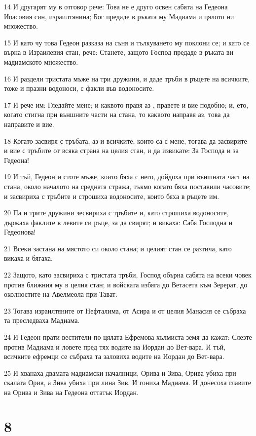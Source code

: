 \par 14 И другарят му в отговор рече: Това не е друго освен сабята на Гедеона Иоасовия син, израилтянина; Бог предаде в ръката му Мадиама и цялото ни множество.
\par 15 И като чу това Гедеон разказа на съня и тълкуването му поклони се; и като се върна в Израилевия стан, рече: Станете, защото Господ предаде в ръката ви мадиамското множество.
\par 16 И раздели тристата мъже на три дружини, и даде тръби в ръцете на всичките, тоже и празни водоноси, с факли във водоносите.
\par 17 И рече им: Гледайте мене; и каквото правя аз , правете и вие подобно; и, ето, когато стигна при външните части на стана, то каквото направя аз, това да направите и вие.
\par 18 Когато засвиря с тръбата, аз и всичките, които са с мене, тогава да засвирите и вие с тръбите от всяка страна на целия стан, и да извикате: За Господа и за Гедеона!
\par 19 И тъй, Гедеон и стоте мъже, които бяха с него, дойдоха при външната част на стана, около началото на средната стража, тъкмо когато бяха поставили часовите; и засвириха с тръбите и строшиха водоносите, които бяха в ръцете им.
\par 20 Па и трите дружини зесвириха с тръбите и, като строшиха водоносите, държаха факлите в левите си ръце, за да свирят; и викаха: Сабя Господна и Гедеонова!
\par 21 Всеки застана на мястото си около стана; и целият стан се разтича, като викаха и бягаха.
\par 22 Защото, като засвириха с тристата тръби, Господ обърна сабята на всеки човек против ближния му в целия стан; и войската избяга до Ветасета към Зерерат, до околностите на Авелмеола при Тават.
\par 23 Тогава израилтяните от Нефталима, от Асира и от целия Манасия се събраха та преследваха Мадиама.
\par 24 И Гедеон прати вестители по цялата Ефремова хълмиста земя да кажат: Слезте против Мадиама и ловете пред тях водите на Иордан до Вет-вара. И тъй, всичките ефремци се събраха та заловиха водите на Иордан до Вет-вара.
\par 25 И хванаха двамата мадиамски началници, Орива и Зива, Орива убиха при скалата Орив, а Зива убиха при лина Зив. И гониха Мадиама. И донесоха главите на Орива и Зива на Гедеона оттатък Иордан.

\chapter{8}

